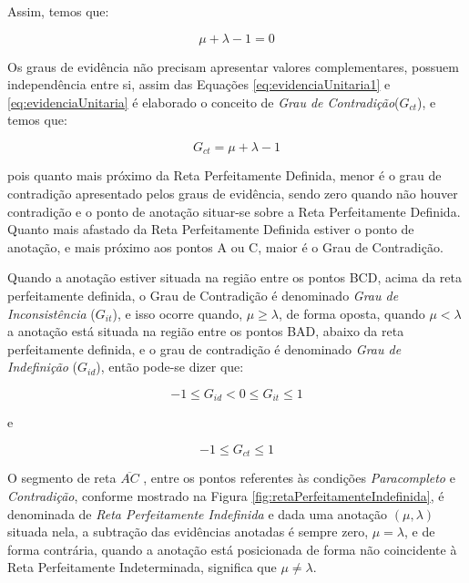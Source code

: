 Assim, temos que:

\begin{center}
\begin{equation}
\mu + \lambda - 1 = 0
\label{eq:evidenciaUnitaria}
\end{equation}
\end{center}


Os graus de evidência não precisam apresentar valores complementares, possuem independência entre si, assim das Equações  
\ref{eq:evidenciaUnitaria1} e 
\ref{eq:evidenciaUnitaria} 
é elaborado o conceito de 
\emph{Grau de Contradição}($G_{ct}$), 
e temos que: 

\begin{center}
\begin{equation}
G _{ct} = \mu + \lambda - 1
\label{eq:grauIncerteza}
\end{equation}
\end{center}

pois quanto mais próximo da Reta Perfeitamente Definida, menor é o grau de contradição apresentado pelos graus de evidência, sendo zero quando não houver contradição e o ponto de anotação situar-se sobre a Reta Perfeitamente Definida. 
Quanto mais afastado da Reta Perfeitamente Definida estiver o ponto de anotação, e mais próximo aos pontos A ou C, maior é o Grau de Contradição. 

Quando a anotação estiver situada na região entre os pontos BCD, acima da reta perfeitamente definida, o Grau de Contradição é denominado 
\emph{Grau de Inconsistência} ($G_{it}$), 
e isso ocorre quando, $\mu \ge \lambda $, de forma oposta, quando $\mu < \lambda $ a anotação está situada na região entre os pontos BAD, abaixo da reta perfeitamente definida, e o grau de contradição é denominado 
\emph{Grau de Indefinição} ($G_{id}$), 
então pode-se dizer que:

\begin{center}
\begin{equation}
-1 \le G _{id}  <  0 \le G _{it} \le 1
\label{eq:grauInconsistenciaIndefinicao}
\end{equation}
\end{center}
e
\begin{center}
\begin{equation}
-1 \le G _{ct} \le 1
\label{eq:grauInconsistenciaIndefinicao1}
\end{equation}
\end{center}


O segmento de reta $\overline{ AC }$ , entre os pontos referentes às condições \emph{Paracompleto} e \emph{Contradição}, conforme mostrado na Figura \ref{fig:retaPerfeitamenteIndefinida}, é denominada de \emph{Reta Perfeitamente Indefinida} e dada uma anotação $(\mu, \lambda )$ situada nela, a subtração das evidências anotadas é sempre zero, $\mu = \lambda$, e de forma contrária, quando a anotação está posicionada de forma não coincidente à Reta Perfeitamente Indeterminada, significa que $\mu \neq \lambda$.

